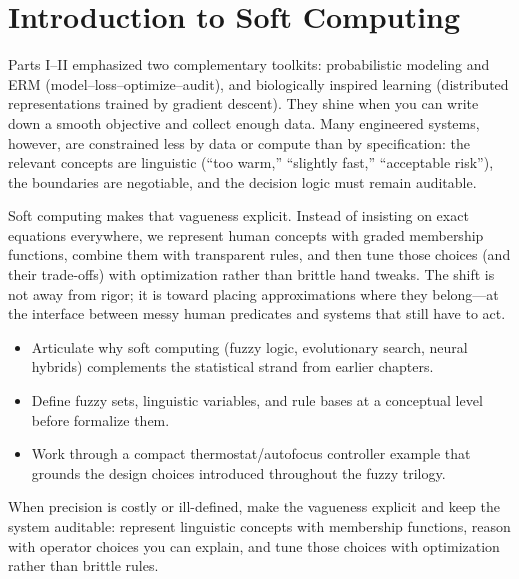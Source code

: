 \section{Introduction to Soft Computing}\label{chap:softcomp}
\graphicspath{{assets/lec8/}}

Parts I--II emphasized two complementary toolkits: probabilistic modeling and ERM (model--loss--optimize--audit), and biologically inspired learning (distributed representations trained by gradient descent). They shine when you can write down a smooth objective and collect enough data. Many engineered systems, however, are constrained less by data or compute than by specification: the relevant concepts are linguistic (``too warm,'' ``slightly fast,'' ``acceptable risk''), the boundaries are negotiable, and the decision logic must remain auditable.

Soft computing makes that vagueness explicit. Instead of insisting on exact equations everywhere, we represent human concepts with graded membership functions, combine them with transparent rules, and then tune those choices (and their trade-offs) with optimization rather than brittle hand tweaks. The shift is not away from rigor; it is toward placing approximations where they belong---at the interface between messy human predicates and systems that still have to act.

\begin{tcolorbox}[summarybox, title={Learning Outcomes}]
\begin{itemize}
    \item Articulate why soft computing (fuzzy logic, evolutionary search, neural hybrids) complements the statistical strand from earlier chapters.
    \item Define fuzzy sets, linguistic variables, and rule bases at a conceptual level before  formalize them.
    \item Work through a compact thermostat/autofocus controller example that grounds the design choices introduced throughout the fuzzy trilogy.
\end{itemize}
\end{tcolorbox}

\begin{tcolorbox}[summarybox, title={Design motif}]
When precision is costly or ill-defined, make the vagueness explicit and keep the system auditable: represent linguistic concepts with membership functions, reason with operator choices you can explain, and tune those choices with optimization rather than brittle rules.
\end{tcolorbox}

